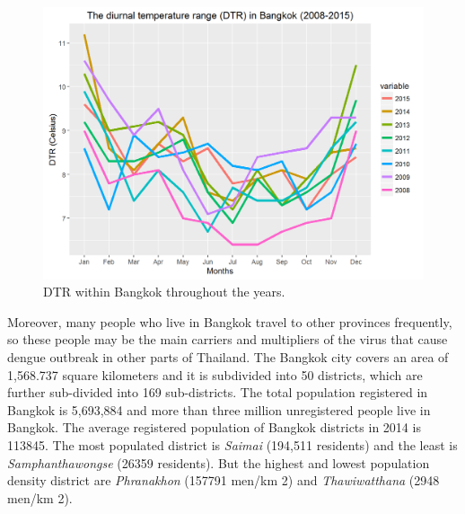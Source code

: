 \documentclass{bmcart}
\begin{document}
\begin{figure}[htbp]
	\begin{center}
		\includegraphics[width= 1.0\textwidth]{2-AvgMonthlyDTR}
		\caption{DTR within Bangkok throughout the years.}
		\label{figure-avg_temp_bangkok}
	\end{center}
\end{figure}


Moreover, many people who live in Bangkok travel to other provinces frequently, so these people may be the main carriers and multipliers of the virus that cause dengue outbreak in other parts of Thailand. The Bangkok city covers an area of 1,568.737 square kilometers and it is subdivided into 50 districts, which are further sub-divided into 169 sub-districts. The total population registered in Bangkok is 5,693,884 and more than three million unregistered people live in Bangkok. The average registered population of Bangkok districts in 2014 is 113845. The most populated district is \textit{Saimai} (194,511 residents) and the least is \textit{Samphanthawongse} (26359 residents). But the highest and lowest population density district are \textit{Phranakhon} (157791 men/km 2) and \textit{Thawiwatthana} (2948 men/km 2). 



\end{document}

